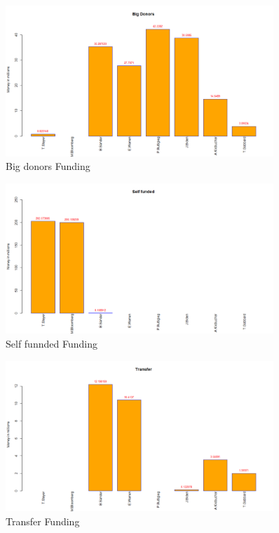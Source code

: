 \begin{figure}[H]
    \centering
    \includegraphics[width=0.9\textwidth]{figures/Bigdonor.png}
    \caption{Big donors Funding}
    \label{Bigdonor}
\end{figure}

\begin{figure}[H]
    \centering
    \includegraphics[width=0.9\textwidth]{figures/Selffunnded.png}
    \caption{Self funnded Funding}
    \label{Selffunnded}
\end{figure}

\begin{figure}[H]
    \centering
    \includegraphics[width=0.9\textwidth]{figures/Transfer.png}
    \caption{Transfer Funding}
    \label{Transfer}
\end{figure}

